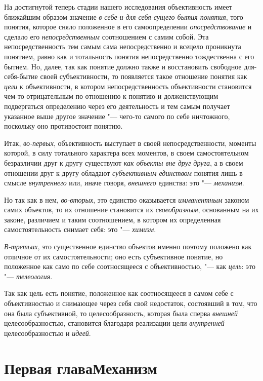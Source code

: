 На достигнутой теперь стадии нашего исследования объективность
имеет ближайшим образом значение {\em в-себе-и-для-себя-сущего бытия
понятия}, того понятия, которое сняло положенное в его
самоопределении {\em опосредствование} и сделало его {\em непосредственным}
соотношением с самим собой. Эта непосредственность тем самым
сама непосредственно и всецело проникнута понятием, равно как и тотальность
понятия непосредственно тождественна с его бытием. Но, далее, так как
понятие должно также и восстановить свободное для-себя-бытие своей
субъективности, то появляется такое отношение понятия как {\em цели} к
объективности, в котором непосредственность объективности становится чем-то
отрицательным по отношению к понятию и долженствующим подвергаться
определению через его деятельность и тем самым получает указанное выше
другое значение "--- чего-то самого по себе ничтожного,
поскольку оно противостоит понятию.

Итак, {\em во-первых}, объективность выступает в своей непосредственности,
моменты которой, в силу тотального характера всех моментов, в своем
самостоятельном безразличии друг к другу существуют {\em как объекты вне друг
друга}, а в своем отношении друг к другу обладают {\em субъективным единством}
понятия лишь в смысле {\em внутреннего} или, иначе говоря, {\em внешнего}
единства: это "--- {\em механизм}.

Но так как в нем, {\em во-вторых}, это единство оказывается {\em имманентным}
законом самих объектов, то их отношение становится их {\em своеобразным},
основанным на их законе, различием и таким соотношением, в
котором их определенная самостоятельность снимает себя: это "--- {\em химизм}.

{\em В-третьих}, это
существенное единство объектов именно поэтому положено как отличное от их
самостоятельности; оно есть субъективное понятие, но положенное как само по
себе соотносящееся с объективностью, "--- как
{\em цель}: это "--- {\em телеология}.

Так как цель есть понятие, положенное как соотносящееся в
самом себе с объективностью и снимающее через себя свой недостаток,
состоявший в том, что она была субъективной, то целесообразность, которая
была сперва {\em внешней} целесообразностью, становится благодаря реализации
цели {\em внутренней} целесообразностью и {\em идеей}.

\chapter[Первая глава Механизм]{Первая глава\newline Механизм}

